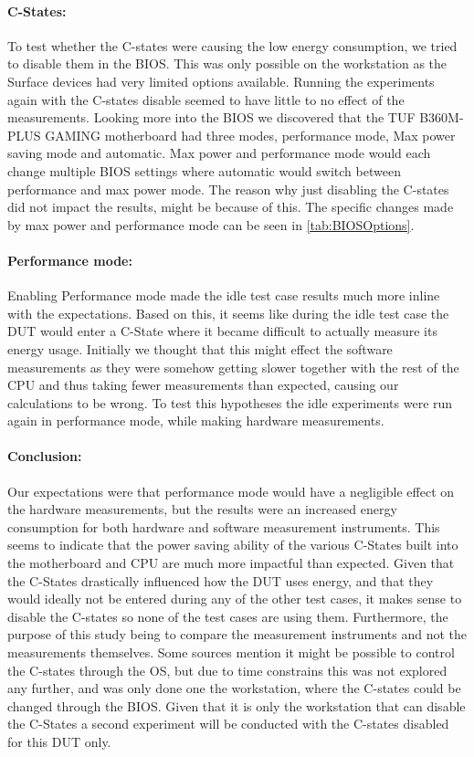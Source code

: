 \paragraph{C-States:} To test whether the C-states were causing the low energy consumption, we tried to disable them in the BIOS. This was only possible on the workstation as the Surface devices had very limited options available. Running the experiments again with the C-states disable seemed to have little to no effect of the measurements. Looking more into the BIOS we discovered that the TUF B360M-PLUS GAMING motherboard had three modes, performance mode, Max power saving mode and automatic. Max power and performance mode would each change multiple BIOS settings where automatic would switch between performance and max power mode. The reason why just disabling the C-states did not impact the results, might be because of this. The specific changes made by max power and performance mode can be seen in \cref{tab:BIOSOptions}.



\paragraph{Performance mode:} Enabling Performance mode made the idle test case results much more inline with the expectations. Based on this, it seems like during the idle test case the DUT would enter a C-State where it became difficult to actually measure its energy usage. Initially we thought that this might effect the software measurements as they were somehow getting slower together with the rest of the CPU and thus taking fewer measurements than expected, causing our calculations to be wrong. To test this hypotheses the idle experiments were run again in performance mode, while making hardware measurements. 

\paragraph{Conclusion:} Our expectations were that performance mode would have a negligible effect on the hardware measurements, but the results were an increased energy consumption for both hardware and software measurement instruments. This seems to indicate that the power saving ability of the various C-States built into the motherboard and CPU are much more impactful than expected. Given that the C-States drastically influenced how the DUT uses energy, and that they would ideally not be entered during any of the other test cases, it makes sense to disable the C-states so none of the test cases are using them. Furthermore, the purpose of this study being to compare the measurement instruments and not the measurements themselves. Some sources mention it might be possible to control the C-states through the OS\cite{CMete,CLinux}, but due to time constrains this was not explored any further, and was only done one the workstation, where the C-states could be changed through the BIOS. Given that it is only the workstation that can disable the C-States a second experiment will be conducted with the C-states disabled for this DUT only.
